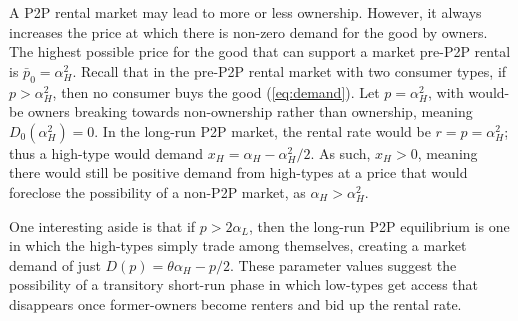 \documentclass[11pt]{article}
\begin{document}

A P2P rental market may lead to more or less ownership.
However, it always increases the price at which there is non-zero demand for the good by owners. 
The highest possible price for the good that can support a market pre-P2P rental is $\bar{p}_0 = \alpha_H^2$.
Recall that in the pre-P2P rental market with two consumer types, if $p > \alpha_H^2$, then no consumer buys the good (\ref{eq:demand}).
Let $p = \alpha_H^2$, with would-be owners breaking towards non-ownership rather than ownership, meaning $D_0(\alpha_H^2) = 0$. 
In the long-run P2P market, the rental rate would be $r = p = \alpha_H^2$; thus a high-type would demand $x_H = \alpha_H - \alpha_H^2/2$.
As such, $x_H > 0$, meaning there would still be positive demand from high-types at a price that would foreclose the possibility of a non-P2P market, as  $\alpha_H > \alpha_H^2$.  

One interesting aside is that if $p > 2 \alpha_L$, then the long-run P2P equilibrium is one in which the high-types simply trade among themselves, creating a market demand of just $D(p) = \theta \alpha_H - p/2$. 
These parameter values suggest the possibility of a transitory short-run phase in which low-types get access that disappears once former-owners become renters and bid up the rental rate. 
\end{document}
